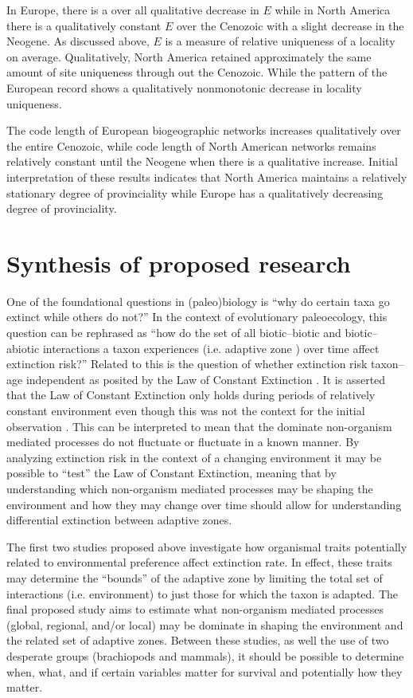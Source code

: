 \documentclass[12pt,letterpaper]{article}
\begin{document}
In Europe, there is a over all qualitative decrease in \(E\) while in North America there is a qualitatively constant \(E\) over the Cenozoic with a slight decrease in the Neogene. As discussed above, \(E\) is a measure of relative uniqueness of a locality on average. Qualitatively, North America retained approximately the same amount of site uniqueness through out the Cenozoic. While the pattern of the European record shows a qualitatively nonmonotonic decrease in locality uniqueness.

The code length of European biogeographic networks increases qualitatively over the entire Cenozoic, while code length of North American networks remains relatively constant until the Neogene when there is a qualitative increase. Initial interpretation of these results indicates that North America maintains a relatively stationary degree of provinciality while Europe has a qualitatively decreasing degree of provinciality. 


\section{Synthesis of proposed research}
One of the foundational questions in (paleo)biology is ``why do certain taxa go extinct while others do not?'' In the context of evolutionary paleoecology, this question can be rephrased as ``how do the set of all biotic--biotic and biotic--abiotic interactions a taxon experiences (i.e. adaptive zone \citealp{Simpson1944}) over time affect extinction risk?'' Related to this is the question of whether extinction risk taxon--age independent as posited by the Law of Constant Extinction \citep{VanValen1973}. It is asserted that the Law of Constant Extinction only holds during periods of relatively constant environment even though this was not the context for the initial observation \citep{Liow2007b,VanValen1973}. This can be interpreted to mean that the dominate non-organism mediated processes do not fluctuate or fluctuate in a known manner. By analyzing extinction risk in the context of a changing environment it may be possible to ``test'' the Law of Constant Extinction, meaning that by understanding which non-organism mediated processes may be shaping the environment and how they may change over time should allow for understanding differential extinction between adaptive zones. 

The first two studies proposed above investigate how organismal traits potentially related to environmental preference affect extinction rate. In effect, these traits may determine the ``bounds'' of the adaptive zone by limiting the total set of interactions (i.e. environment) to just those for which the taxon is adapted. The final proposed study aims to estimate what non-organism mediated processes (global, regional, and/or local) may be dominate in shaping the environment and the related set of adaptive zones. Between these studies, as well the use of two desperate groups (brachiopods and mammals), it should be possible to determine when, what, and if certain variables matter for survival and potentially how they matter. 
\end{document}
